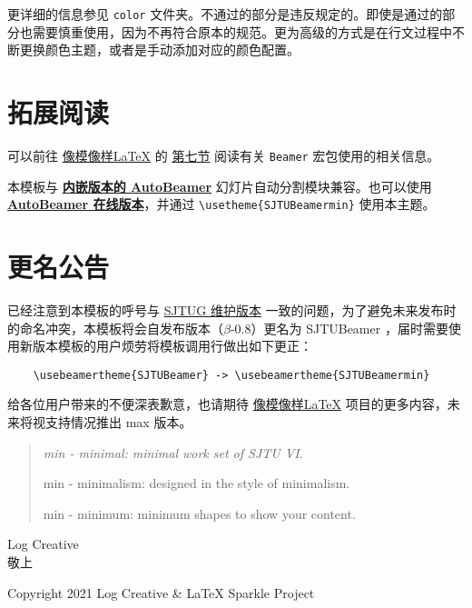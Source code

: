 \documentclass[a4paper,12pt]{article}
\begin{document}
\begin{CJK}{UTF8}{song}
更详细的信息参见 \verb"color" 文件夹。不通过的部分是违反规定的。即使是通过的部分也需要慎重使用，因为不再符合原本的规范。更为高级的方式是在行文过程中不断更换颜色主题，或者是手动添加对应的颜色配置。

\section{拓展阅读}
可以前往 \href{https://logcreative.github.io/LaTeXSparkle/}{像模像样\LaTeX} 的 \href{https://logcreative.github.io/LaTeXSparkle/src/art/chapter07.html}{第七节} 阅读有关 \verb"Beamer" 宏包使用的相关信息。

本模板与 \href{https://github.com/LogCreative/AutoBeamer/tree/pkg}{\textbf{内嵌版本的 \textsf{AutoBeamer}}} 幻灯片自动分割模块兼容。也可以使用 \href{https://logcreative.github.io/AutoBeamer/}{\textbf{\textsf{AutoBeamer} 在线版本}}，并通过 \verb"\usetheme{SJTUBeamermin}" 使用本主题。

\clearpage

\section*{更名公告}

已经注意到本模板的呼号与 \href{https://github.com/sjtug/SJTUBeamer}{SJTUG 维护版本} 一致的问题，为了避免未来发布时的命名冲突，本模板将会自发布版本（$\beta$-0.8）更名为 \textsf{SJTUBeamer} ，届时需要使用新版本模板的用户烦劳将模板调用行做出如下更正：
\begin{verbatim}
    \usebeamertheme{SJTUBeamer} -> \usebeamertheme{SJTUBeamermin}
\end{verbatim}

给各位用户带来的不便深表歉意，也请期待 \href{https://logcreative.github.io/LaTeXSparkle/}{像模像样\LaTeX} 项目的更多内容，未来将视支持情况推出 max 版本。

\begin{quotation}\itshape
    min - minimal: minimal work set of SJTU VI.

    min - minimalism: designed in the style of minimalism.

    min - minimum: minimum shapes to show your content.
\end{quotation}

\noindent Log Creative\\敬上

\vfill

\scriptsize  

Copyright 2021 Log Creative \& \LaTeX{} Sparkle Project


\end{CJK}
\end{document}
